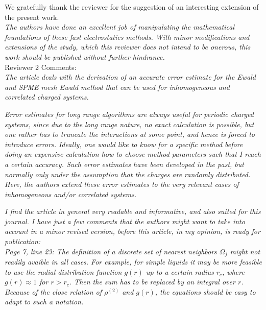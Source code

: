 \documentclass[a4paper]{article}
\begin{document}
We gratefully thank the reviewer for the suggestion of an interesting
extension of the present work.\\

\textit{
The authors have done an excellent job of manipulating the
mathematical foundations of these fast electrostatics methods.  With
minor modifications and extensions of the study, which this reviewer
does not intend to be onerous, this work should be published without
further hindrance.
}\\



\noindent
Reviewer  2 Comments:\\

\textit{ The article deals with the derivation of an accurate error
  estimate for the Ewald and SPME mesh Ewald method that can be used
  for inhomogeneous and correlated charged systems.
}

\textit{
Error estimates for long range algorithms are always useful for
periodic charged systems, since due to the long range nature, no exact
calculation is possible, but one rather has to truncate the
interactions at some point, and hence is forced to introduce errors.
Ideally, one would like to know for a specific method before doing an
expensive calculation how to choose method parameters such that I
reach a certain accuracy. Such error estimates have been developed in
the past, but normally only under the assumption that the charges are
randomly distributed. Here, the authors extend these error estimates
to the very relevant cases of inhomogeneous and/or correlated systems.
}

\textit{
  I find the article in general very readable and informative, and
  also suited for this journal. I have just a few comments that the
  authors might want to take into account in a minor revised version,
  before this article, in my opinion, is ready for publication:
}\\

\textit{ Page 7, line 23: The definition of a discrete set of nearest
  neighbors $\Omega_j$ might not readily avaible in all cases. For
  example, for simple liquids it may be more feasible to use the
  radial distribution function $g(r)$ up to a certain radius $r_c$,
  where $g(r) \approx 1$ for $r > r_c$. Then the sum has to be
  replaced by an integral over $r$.  Because of the close relation of
  $\rho^{(2)}$ and $g(r)$, the equations should be easy to adapt to
  such a notation.  }
\end{document}
